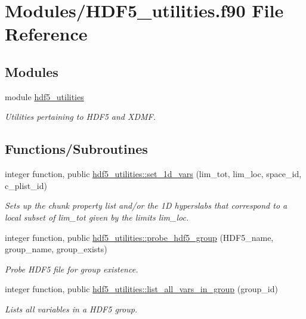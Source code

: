 \hypertarget{HDF5__utilities_8f90}{}\section{Modules/\+H\+D\+F5\+\_\+utilities.f90 File Reference}
\label{HDF5__utilities_8f90}
\subsection*{Modules}
\begin{DoxyCompactItemize}
\item 
module \hyperlink{namespacehdf5__utilities}{hdf5\+\_\+utilities}
\begin{DoxyCompactList}\small\item\em Utilities pertaining to H\+D\+F5 and X\+D\+MF. \end{DoxyCompactList}\end{DoxyCompactItemize}
\subsection*{Functions/\+Subroutines}
\begin{DoxyCompactItemize}
\item 
integer function, public \hyperlink{namespacehdf5__utilities_a7574320980affc30a584f7776d33a51c}{hdf5\+\_\+utilities\+::set\+\_\+1d\+\_\+vars} (lim\+\_\+tot, lim\+\_\+loc, space\+\_\+id, c\+\_\+plist\+\_\+id)
\begin{DoxyCompactList}\small\item\em Sets up the chunk property list and/or the 1D hyperslabs that correspond to a local subset of {\ttfamily lim\+\_\+tot} given by the limits {\ttfamily lim\+\_\+loc}. \end{DoxyCompactList}\item 
integer function, public \hyperlink{namespacehdf5__utilities_ae4e6c96512460a0ede8dc5b1a43681e8}{hdf5\+\_\+utilities\+::probe\+\_\+hdf5\+\_\+group} (H\+D\+F5\+\_\+name, group\+\_\+name, group\+\_\+exists)
\begin{DoxyCompactList}\small\item\em Probe H\+D\+F5 file for group existence. \end{DoxyCompactList}\item 
integer function, public \hyperlink{namespacehdf5__utilities_aa9d76166f970a7052cd0d96c8f3ee0be}{hdf5\+\_\+utilities\+::list\+\_\+all\+\_\+vars\+\_\+in\+\_\+group} (group\+\_\+id)
\begin{DoxyCompactList}\small\item\em Lists all variables in a H\+D\+F5 group. \end{DoxyCompactList}\end{DoxyCompactItemize}
